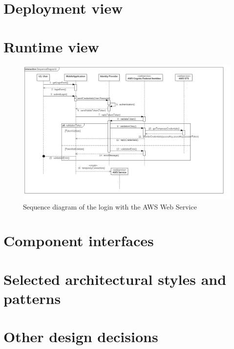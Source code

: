 \section{Deployment view}
\label{sec:depl_view}

\section{Runtime view}
\label{sec:runtime_view}

\begin{figure}
	\centering
	\includegraphics[width=6in]{./diagrams/SequenceDiagramLogin.png}
	\caption{Sequence diagram of the login with the AWS Web Service}
	\label{fig:seqLogin}
\end{figure}

\section{Component interfaces}
\label{sec:runtime_view}

\section{Selected architectural styles and patterns}
\label{sec:archs}

\section{Other design decisions}
\label{sec:des_dec}